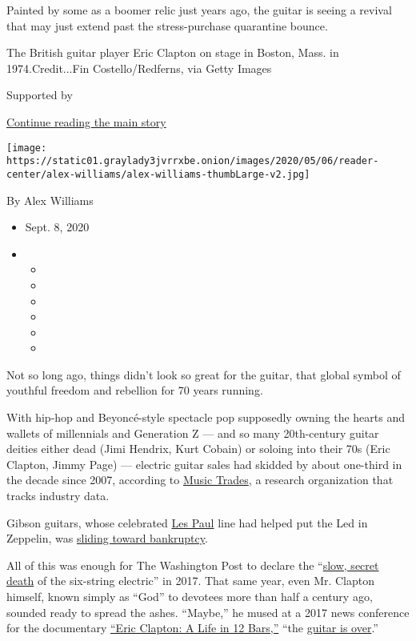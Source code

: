 Painted by some as a boomer relic just years ago, the guitar is seeing a
revival that may just extend past the stress-purchase quarantine bounce.

The British guitar player Eric Clapton on stage in Boston, Mass. in
1974.Credit...Fin Costello/Redferns, via Getty Images

Supported by

\protect\hyperlink{after-sponsor}{Continue reading the main story}

\texttt{[image: https://static01.graylady3jvrrxbe.onion/images/2020/05/06/reader-center/alex-williams/alex-williams-thumbLarge-v2.jpg]}

By Alex Williams

\begin{itemize}
\item
  Sept. 8, 2020
\item
  \begin{itemize}
  \item
  \item
  \item
  \item
  \item
  \item
  \end{itemize}
\end{itemize}

Not so long ago, things didn't look so great for the guitar, that global
symbol of youthful freedom and rebellion for 70 years running.

With hip-hop and Beyoncé-style spectacle pop supposedly owning the
hearts and wallets of millennials and Generation Z --- and so many
20th-century guitar deities either dead (Jimi Hendrix, Kurt Cobain) or
soloing into their 70s (Eric Clapton, Jimmy Page) --- electric guitar
sales had skidded by about one-third in the decade since 2007, according
to \href{https://www.musictrades.com/about.html}{Music Trades}, a
research organization that tracks industry data.

Gibson guitars, whose celebrated
\href{https://www.gibson.com/Guitars/Les-Paul}{Les Paul} line had helped
put the Led in Zeppelin, was
\href{https://www.reuters.com/article/us-gibson-brands-bankruptcy/after-bankruptcy-gibson-plots-return-to-basics-and-possibly-ukuleles-idUSKBN1JN3AL\#:~:text=Nashville\%2Dbased\%20Gibson\%2C\%20the\%20maker,new\%20ownership\%20of\%20its\%20lenders.}{sliding
toward bankruptcy}.

All of this was enough for The Washington Post to declare the
``\href{https://www.washingtonpost.com/graphics/2017/lifestyle/the-slow-secret-death-of-the-electric-guitar/}{slow,
secret death} of the six-string electric'' in 2017. That same year, even
Mr. Clapton himself, known simply as ``God'' to devotees more than half
a century ago, sounded ready to spread the ashes. ``Maybe,'' he mused at
a 2017 news conference for the documentary
\href{https://www.nytimes3xbfgragh.onion/2017/11/23/movies/eric-clapton-a-life-in-12-bars-review.html}{``Eric
Clapton: A Life in 12 Bars,''} ``the
\href{https://www.billboard.com/articles/columns/rock/7957989/eric-clapton-guitar-sales-declining-tiff}{guitar
is over}.''

